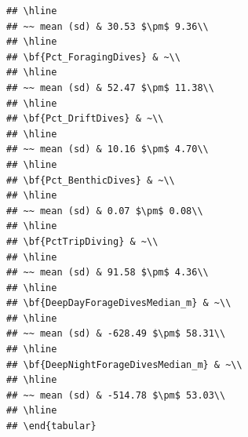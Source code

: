 \documentclass[
]{article}
\newenvironment{Shaded}{\begin{snugshade}}{\end{snugshade}}
\newcommand{\AttributeTok}[1]{\textcolor[rgb]{0.13,0.29,0.53}{#1}}
\newcommand{\FloatTok}[1]{\textcolor[rgb]{0.00,0.00,0.81}{#1}}
\newcommand{\FunctionTok}[1]{\textcolor[rgb]{0.13,0.29,0.53}{\textbf{#1}}}
\newcommand{\NormalTok}[1]{#1}
\newcommand{\OtherTok}[1]{\textcolor[rgb]{0.56,0.35,0.01}{#1}}
\newcommand{\SpecialCharTok}[1]{\textcolor[rgb]{0.81,0.36,0.00}{\textbf{#1}}}
\newcommand{\StringTok}[1]{\textcolor[rgb]{0.31,0.60,0.02}{#1}}
\begin{document}
\begin{verbatim}
## \hline
## ~~ mean (sd) & 30.53 $\pm$ 9.36\\
## \hline
## \bf{Pct_ForagingDives} & ~\\
## \hline
## ~~ mean (sd) & 52.47 $\pm$ 11.38\\
## \hline
## \bf{Pct_DriftDives} & ~\\
## \hline
## ~~ mean (sd) & 10.16 $\pm$ 4.70\\
## \hline
## \bf{Pct_BenthicDives} & ~\\
## \hline
## ~~ mean (sd) & 0.07 $\pm$ 0.08\\
## \hline
## \bf{PctTripDiving} & ~\\
## \hline
## ~~ mean (sd) & 91.58 $\pm$ 4.36\\
## \hline
## \bf{DeepDayForageDivesMedian_m} & ~\\
## \hline
## ~~ mean (sd) & -628.49 $\pm$ 58.31\\
## \hline
## \bf{DeepNightForageDivesMedian_m} & ~\\
## \hline
## ~~ mean (sd) & -514.78 $\pm$ 53.03\\
## \hline
## \end{tabular}
\end{verbatim}

\begin{Shaded}
\end{Shaded}
\end{document}
